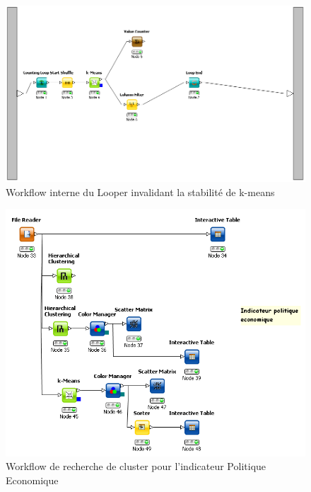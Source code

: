 \begin{figure}[H]
	\begin{center}
		\includegraphics[scale=0.5]{Image/WorklowLoop}
		\caption{Workflow interne du Looper invalidant la stabilité de k-means}
	\end{center}
\end{figure}
\begin{figure}[H]
	\begin{center}
		\includegraphics[scale=0.5]{Image/WorkflowClusteringSantePolitique}
		\caption{Workflow de recherche de cluster pour l'indicateur Politique Economique}
	\end{center}
\end{figure}
